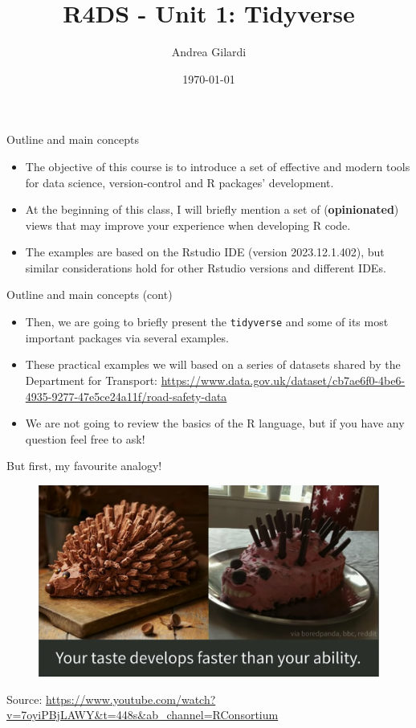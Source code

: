 \documentclass[
hyperref={bookmarks=false},
xcolor={dvipsnames,svgnames*,x11names*}, 
12pt
]{beamer}
\title{R4DS - Unit 1: Tidyverse}
\author{Andrea Gilardi}
\date{\today}
\begin{document}
\inserttitlepage

\begin{frame}{Outline and main concepts}
\vspace{-0.5cm}
\begin{itemize}
\itemsep 3ex
\item The objective of this course is to introduce a set of effective and modern tools for data science, version-control and R packages' development. 
\item At the beginning of this class, I will briefly mention a set of (\textbf{opinionated}) views that may improve your experience when developing R code. 
\item The examples are based on the Rstudio IDE (version 2023.12.1.402), but similar considerations hold for other Rstudio versions and different IDEs. 
\end{itemize}
\end{frame}

\begin{frame}{Outline and main concepts (cont)}
\vspace{-0.5cm}
\begin{itemize}
\itemsep 3ex
\item Then, we are going to briefly present the \texttt{tidyverse} and some of its most important packages via several examples. 
\item These practical examples we will based on a series of datasets shared by the Department for Transport: \url{https://www.data.gov.uk/dataset/cb7ae6f0-4be6-4935-9277-47e5ce24a11f/road-safety-data}
\item We are not going to review the basics of the R language, but if you have any question feel free to ask! 
\end{itemize}
\end{frame}

\begin{frame}{But first, my favourite analogy!}
\vspace{-0.35cm}
\begin{figure}
\centering
\includegraphics[width=0.95\linewidth]{figures/hedgehog.png}
\end{figure}
Source: \url{https://www.youtube.com/watch?v=7oyiPBjLAWY&t=448s&ab_channel=RConsortium}
\end{frame}
\end{document}
